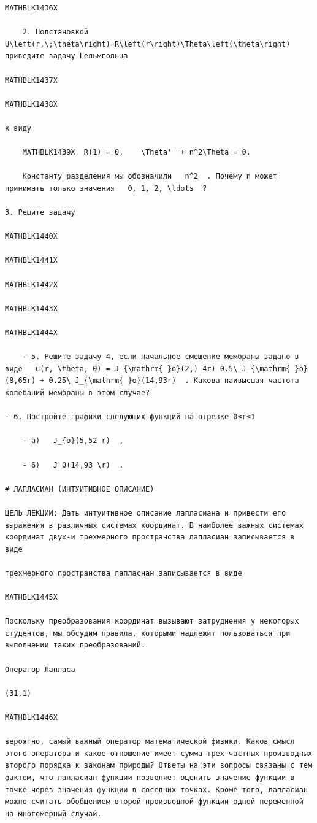 \documentclass[
]{article}
\begin{document}
\begin{verbatim}
MATHBLK1436X

    2. Подстановкой   U\left(r,\;\theta\right)=R\left(r\right)\Theta\left(\theta\right)   приведите задачу Гельмгольца

MATHBLK1437X

MATHBLK1438X

к виду

    MATHBLK1439X  R(1) = 0,    \Theta'' + n^2\Theta = 0.

    Константу разделения мы обозначили   n^2  . Почему n может принимать только значения   0, 1, 2, \ldots  ?

3. Решите задачу

MATHBLK1440X

MATHBLK1441X

MATHBLK1442X

MATHBLK1443X

MATHBLK1444X

    - 5. Решите задачу 4, если начальное смещение мембраны задано в виде   u(r, \theta, 0) = J_{\mathrm{ }o}(2,) 4r) 0.5\ J_{\mathrm{ }o}(8,65r) + 0.25\ J_{\mathrm{ }o}(14,93r)  . Какова наивысшая частота колебаний мембраны в этом случае?

- 6. Постройте графики следующих функций на отрезке 0≤r≤1

    - a)   J_{o}(5,52 r)  ,

    - 6)   J_0(14,93 \r)  .

# ЛАПЛАСИАН (ИНТУИТИВНОЕ ОПИСАНИЕ)

ЦЕЛЬ ЛЕКЦИИ: Дать интуитивное описание лапласиана и привести его выражения в различных системах координат. В наиболее важных системах координат двух-и трехмерного пространства лапласиан записывается в виде

трехмерного пространства лапласнан записывается в виде

MATHBLK1445X

Поскольку преобразования координат вызывают затруднения у некогорых студентов, мы обсудим правила, которыми надлежит пользоваться при выполнении таких преобразований.

Оператор Лапласа

(31.1)

MATHBLK1446X

вероятно, самый важный оператор математической физики. Каков смысл этого оператора и какое отношение имеет сумма трех частных производных второго порядка к законам природы? Ответы на эти вопросы связаны с тем фактом, что лапласиан функции позволяет оценить значение функции в точке через значения функции в соседних точках. Кроме того, лапласиан можно считать обобщением второй производной функции одной переменной на многомерный случай.


\end{verbatim}
\end{document}
